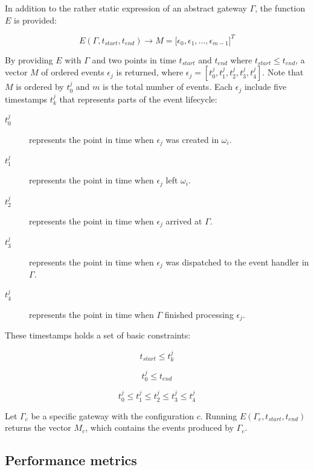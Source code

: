 In addition to the rather static expression of an abstract gateway $\Gamma$,
the function $E$ is provided:

\begin{equation}
E(\Gamma, t_{start}, t_{end}) \to M = \big[ \epsilon_0, \epsilon_1, ...,
\epsilon_{m-1} \big]^T
\end{equation}

By providing $E$ with $\Gamma$ and two points in time $t_{start}$ and $t_{end}$
where $t_{start} \leq t_{end}$, a vector $M$ of ordered events $\epsilon_j$ is
returned, where $\epsilon_j = [ t_0^j, t_1^j, t_2^j, t_3^j, t_4^j ]$. Note that
$M$ is ordered by $t_0^j$ and $m$ is the total number of events. Each
$\epsilon_j$ include five timestamps $t_k^j$ that represents parts of the event
lifecycle:

\begin{description}
\item[$t_0^j$] represents the point in time when $\epsilon_j$ was created in
    $\omega_i$.
\item[$t_1^j$] represents the point in time when $\epsilon_j$ left $\omega_i$.
\item[$t_2^j$] represents the point in time when $\epsilon_j$ arrived at
    $\Gamma$.
\item[$t_3^j$] represents the point in time when $\epsilon_j$ was dispatched to
    the event handler in $\Gamma$.
\item[$t_4^j$] represents the point in time when $\Gamma$ finished processing
    $\epsilon_j$.
\end{description}

These timestamps holds a set of basic constraints:

\begin{equation}
t_{start} \leq t_k^j
\end{equation}

\begin{equation} \label{eq:t_0}
t_0^j \leq t_{end}
\end{equation}

\begin{equation}
t_0^j \leq t_1^j \leq t_2^j \leq t_3^j \leq t_4^j
\end{equation}

Let $\Gamma_c$ be a specific gateway with the configuration $c$.  Running
$E(\Gamma_c, t_{start}, t_{end})$ returns the vector $M_c$, which contains the
events produced by $\Gamma_c$.

\subsection{Performance metrics}
\label{sec:performance_metrics}

